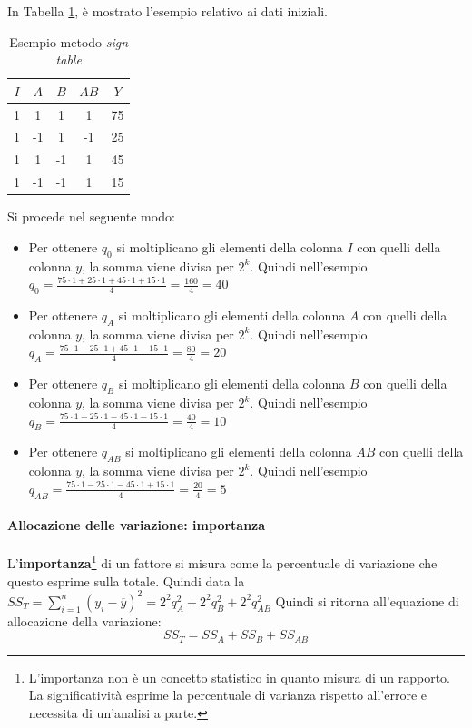 \documentclass{article}
\begin{document}
In Tabella \ref{tab:ex-sign-method}, è mostrato l'esempio relativo ai dati iniziali.

\begin{table}[h]
  \begin{center}
    \begin{tabular}[c]{|c|c|c|c|c|}
      \hline
      \multicolumn{1}{|c|}{\textbf{$I$}} & 
      \multicolumn{1}{c|}{\textbf{$A$}} & 
      \multicolumn{1}{c|}{\textbf{$B$}} & 
      \multicolumn{1}{c|}{\textbf{$AB$}} & 
      \multicolumn{1}{c|}{\textbf{$Y$}} \\ 

      \hline
      1 & 1 & 1 & 1 & 75 \\
      1 & -1 & 1 & -1 & 25 \\
      1 & 1 & -1 & 1 & 45 \\
      1 & -1 & -1 & 1 & 15 \\
      \hline
    \end{tabular}
    \caption{Esempio metodo \textit{sign table}}
    \label{tab:ex-sign-method}
  \end{center}
\end{table}

Si procede nel seguente modo:
\begin{itemize}
  \item Per ottenere $q_0$ si moltiplicano gli elementi della colonna $I$ con quelli della 
    colonna $y$, la somma viene divisa per $2^k$. Quindi nell'esempio $q_0 = \frac{75\cdot1 + 
    25\cdot1 + 45\cdot1 + 15\cdot1}{4} = \frac{160}{4} = 40$
  \item Per ottenere $q_A$ si moltiplicano gli elementi della colonna $A$ con quelli della 
    colonna $y$, la somma viene divisa per $2^k$. Quindi nell'esempio $q_A = \frac{75\cdot1 - 
    25\cdot1 + 45\cdot1 - 15\cdot1}{4} = \frac{80}{4} = 20$
  \item Per ottenere $q_B$ si moltiplicano gli elementi della colonna $B$ con quelli della 
    colonna $y$, la somma viene divisa per $2^k$. Quindi nell'esempio $q_B = \frac{75\cdot1 + 
    25\cdot1 - 45\cdot1 - 15\cdot1}{4} = \frac{40}{4} = 10$
  \item Per ottenere $q_{AB}$ si moltiplicano gli elementi della colonna $AB$ con quelli della 
    colonna $y$, la somma viene divisa per $2^k$. Quindi nell'esempio $q_{AB} = \frac{75\cdot1
    - 25\cdot1 - 45\cdot1 + 15\cdot1}{4} = \frac{20}{4} = 5$
\end{itemize}

\paragraph{Allocazione delle variazione: importanza} L'\textbf{importanza}\footnote{
  L'importanza non è un concetto statistico in quanto misura di un rapporto. La significatività
  esprime la percentuale di varianza rispetto all'errore e necessita di un'analisi a parte.} 
di un fattore si misura come la percentuale di 
variazione che questo esprime sulla totale. Quindi data la $SS_T = 
\sum_{i=1}^n(y_i - \overline{y})^2 = 2^2q_A^2 + 2^2q_B^2 + 2^2q_{AB}^2$
Quindi si ritorna all'equazione di allocazione della variazione:
\[
  SS_T = SS_A + SS_B + SS_{AB}
\]
\end{document}
